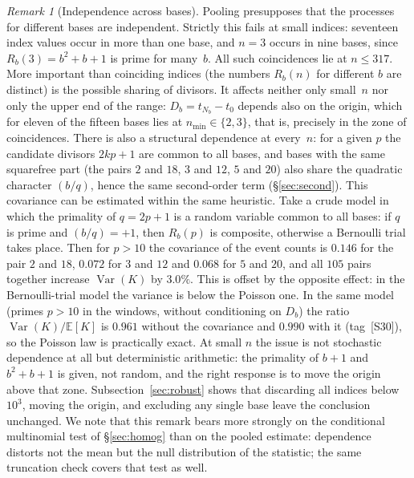 \documentclass[11pt,a4paper]{article}
\theoremstyle{plain}
\theoremstyle{remark}
\newtheorem{remark}{Remark}
\newcommand{\Rb}{R_b}
\begin{document}
\begin{remark}[Independence across bases]\label{rem:indep}
Pooling presupposes that the processes for different bases are independent.
Strictly this fails at small indices: seventeen index values occur in more than
one base, and $n=3$ occurs in nine bases, since $\Rb(3)=b^2+b+1$ is prime for
many~$b$. All such coincidences lie at $n\le317$. More important than coinciding
indices (the numbers $\Rb(n)$ for different $b$ are distinct) is the possible
sharing of divisors. It affects neither only small~$n$ nor only the upper end of
the range: $D_b=t_{N_b}-t_0$ depends also on the origin, which for eleven of the
fifteen bases lies at $n_{\min}\in\{2,3\}$, that is, precisely in the zone of
coincidences. There is also a structural dependence at every~$n$: for a given $p$
the candidate divisors $2kp+1$ are common to all bases, and bases with the same
squarefree part (the pairs $2$ and $18$, $3$ and $12$, $5$ and $20$) also share
the quadratic character $(b/q)$, hence the same second-order term
(\S\ref{sec:second}). This covariance can be estimated within the same
heuristic. Take a crude model in which the primality of $q=2p+1$ is a random
variable common to all bases: if $q$ is prime and $(b/q)=+1$, then $\Rb(p)$ is
composite, otherwise a Bernoulli trial takes place. Then for $p>10$ the covariance
of the event counts is $0.146$ for the pair $2$ and $18$, $0.072$ for $3$ and $12$
and $0.068$ for $5$ and $20$, and all $105$ pairs together increase
$\operatorname{Var}(K)$ by $3.0\%$. This is offset by the opposite effect: in the
Bernoulli-trial model the variance is below the Poisson one. In the same model
(primes $p>10$ in the windows, without conditioning on $D_b$) the ratio
$\operatorname{Var}(K)/\mathbb E[K]$ is $0.961$ without the covariance and $0.990$
with it (tag~[S30]), so the Poisson law is practically exact. At small $n$ the issue is not stochastic
dependence at all but deterministic arithmetic: the primality of $b+1$ and
$b^2+b+1$ is given, not random, and the right response is to move the origin above
that zone. Subsection~\ref{sec:robust} shows that discarding all indices
below~$10^3$, moving the origin, and excluding any single base leave the
conclusion unchanged. We note that
this remark bears more strongly on the conditional multinomial test of
\S\ref{sec:homog} than on the pooled estimate: dependence distorts not the mean
but the null distribution of the statistic; the same truncation check covers
that test as well.
\end{remark}
\end{document}
